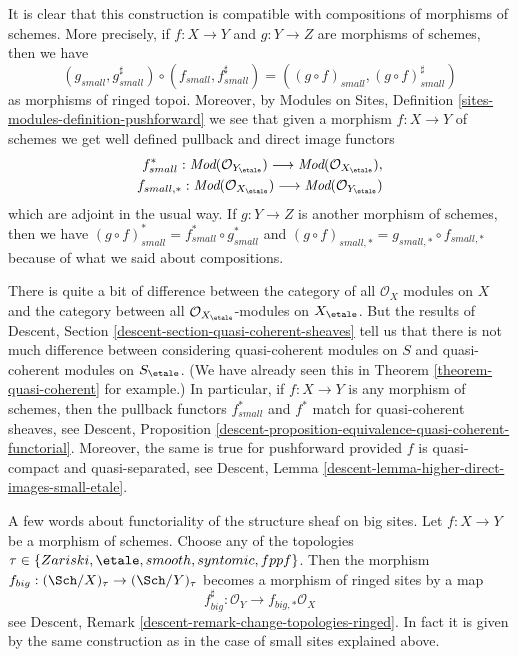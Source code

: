 \medskip\noindent
It is clear that this construction is compatible with compositions of
morphisms of schemes. More precisely, if $f : X \to Y$ and $g : Y \to Z$
are morphisms of schemes, then we have
$$
(g_{small}, g_{small}^\sharp)
\circ
(f_{small}, f_{small}^\sharp)
=
((g \circ f)_{small}, (g \circ f)_{small}^\sharp)
$$
as morphisms of ringed topoi. Moreover, by
Modules on Sites, Definition \ref{sites-modules-definition-pushforward}
we see that given a morphism $f : X \to Y$ of schemes
we get well defined pullback and direct image functors
\begin{align*}
f_{small}^* :
\textit{Mod}(\mathcal{O}_{Y_\etale})
\longrightarrow
\textit{Mod}(\mathcal{O}_{X_\etale}), \\
f_{small, *} :
\textit{Mod}(\mathcal{O}_{X_\etale})
\longrightarrow
\textit{Mod}(\mathcal{O}_{Y_\etale})
\end{align*}
which are adjoint in the usual way. If $g : Y \to Z$ is another morphism
of schemes, then we have
$(g \circ f)_{small}^* = f_{small}^* \circ g_{small}^*$
and $(g \circ f)_{small, *} = g_{small, *} \circ f_{small, *}$
because of what we said about compositions.

\medskip\noindent
There is quite a bit of difference between the category
of all $\mathcal{O}_X$ modules on $X$ and the category between all
$\mathcal{O}_{X_\etale}$-modules on $X_\etale$. But the
results of
Descent, Section \ref{descent-section-quasi-coherent-sheaves}
tell us that there is not much difference between considering quasi-coherent
modules on $S$ and quasi-coherent modules on $S_\etale$.
(We have already seen this in
Theorem \ref{theorem-quasi-coherent}
for example.)
In particular, if $f : X \to Y$ is any morphism of schemes, then
the pullback functors $f_{small}^*$ and $f^*$ match for
quasi-coherent sheaves, see
Descent,
Proposition \ref{descent-proposition-equivalence-quasi-coherent-functorial}.
Moreover, the same is true for pushforward provided $f$ is
quasi-compact and quasi-separated, see
Descent, Lemma \ref{descent-lemma-higher-direct-images-small-etale}.

\medskip\noindent
A few words about functoriality of the structure sheaf on big sites.
Let $f : X \to Y$ be a morphism of schemes. Choose any of the
topologies $\tau \in \{Zariski,\linebreak[0]
\etale,\linebreak[0] smooth,\linebreak[0] syntomic,\linebreak[0]
fppf\}$. Then the morphism
$f_{big} : (\Sch/X)_\tau \to (\Sch/Y)_\tau$
becomes a morphism of ringed sites by a map
$$
f_{big}^\sharp : \mathcal{O}_Y \longrightarrow f_{big, *}\mathcal{O}_X
$$
see Descent, Remark \ref{descent-remark-change-topologies-ringed}.
In fact it is given by the same construction as in the case of small
sites explained above.












